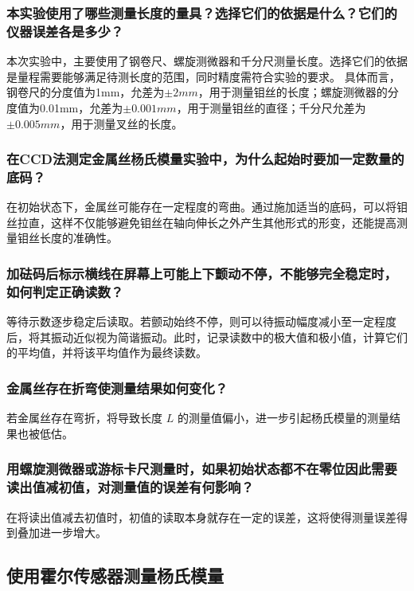 \documentclass[UTF-8,twoside,cs4size]{ctexart}
\begin{document}
\subsubsection{本实验使用了哪些测量长度的量具？选择它们的依据是什么？它们的仪器误差各是多少？}
本次实验中，主要使用了钢卷尺、螺旋测微器和千分尺测量长度。选择它们的依据是量程需要能够满足待测长度的范围，同时精度需符合实验的要求。
具体而言，钢卷尺的分度值为1mm，允差为$\pm 2mm$，用于测量钼丝的长度；螺旋测微器的分度值为0.01mm，允差为$\pm 0.001mm$，用于测量钼丝的直径；千分尺允差为$\pm 0.005mm$，用于测量叉丝的长度。
\subsubsection{在CCD法测定金属丝杨氏模量实验中，为什么起始时要加一定数量的底码？}
在初始状态下，金属丝可能存在一定程度的弯曲。通过施加适当的底码，可以将钼丝拉直，这样不仅能够避免钼丝在轴向伸长之外产生其他形式的形变，还能提高测量钼丝长度的准确性。
\subsubsection{加砝码后标示横线在屏幕上可能上下颤动不停，不能够完全稳定时，如何判定正确读数？}
等待示数逐步稳定后读取。若颤动始终不停，则可以待振动幅度减小至一定程度后，将其振动近似视为简谐振动。此时，记录读数中的极大值和极小值，计算它们的平均值，并将该平均值作为最终读数。
\subsubsection{金属丝存在折弯使测量结果如何变化？}
若金属丝存在弯折，将导致长度 $L$ 的测量值偏小，进一步引起杨氏模量的测量结果也被低估。
\subsubsection{用螺旋测微器或游标卡尺测量时，如果初始状态都不在零位因此需要读出值减初值，对测量值的误差有何影响？ }
在将读出值减去初值时，初值的读取本身就存在一定的误差，这将使得测量误差得到叠加进一步增大。
\subsection{使用霍尔传感器测量杨氏模量}
\end{document}
